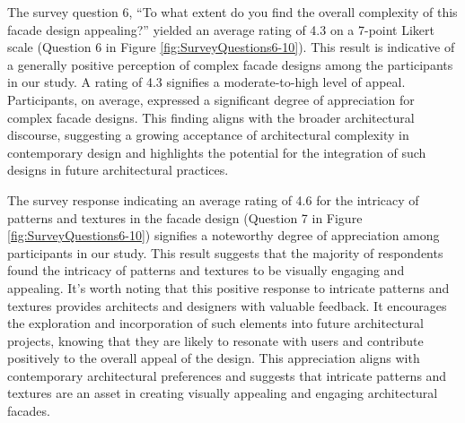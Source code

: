 




The survey question 6, ``To what extent do you find the overall complexity of this facade design appealing?'' yielded an average rating of 4.3 on a 7-point Likert scale (Question 6 in Figure \ref{fig:SurveyQuestions6-10}).
This result is indicative of a generally positive perception of complex facade designs among the participants in our study.
A rating of 4.3 signifies a moderate-to-high level of appeal.
Participants, on average, expressed a significant degree of appreciation for complex facade designs.
This finding aligns with the broader architectural discourse, suggesting a growing acceptance of architectural complexity in contemporary design and highlights the potential for the integration of such designs in future architectural practices.


The survey response indicating an average rating of 4.6 for the intricacy of patterns and textures in the facade design (Question 7 in Figure \ref{fig:SurveyQuestions6-10}) signifies a noteworthy degree of appreciation among participants in our study.
This result suggests that the majority of respondents found the intricacy of patterns and textures to be visually engaging and appealing.
It's worth noting that this positive response to intricate patterns and textures provides architects and designers with valuable feedback.
It encourages the exploration and incorporation of such elements into future architectural projects, knowing that they are likely to resonate with users and contribute positively to the overall appeal of the design.
This appreciation aligns with contemporary architectural preferences and suggests that intricate patterns and textures are an asset in creating visually appealing and engaging architectural facades.

